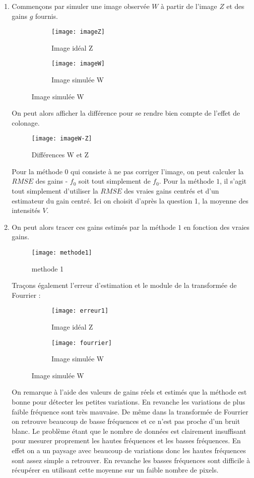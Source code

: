 \documentclass[12pt,a4paper,titlepage]{article}
\begin{document}
\begin{enumerate}
	\item{Commençons par simuler une image observée $W$ à partir de l'image $Z$ et des gains $g$ fournis. 
	\begin{figure}[H]
     		\centering
    		\begin{subfigure}[H]{0.4\textwidth}
         		\centering
         		\texttt{[image: imageZ]}
         		\caption{Image idéal Z}
    		\end{subfigure}
     		\hfill
    	 	\begin{subfigure}[H]{0.4\textwidth}
         		\centering
         		\texttt{[image: imageW]}
         		\caption{Image simulée W}
     		\end{subfigure}
	\end{figure}
	On peut alors afficher la différence pour se rendre bien compte de l'effet de colonage.
	\begin{figure}[H]
    		\texttt{[image: imageW-Z]}
    		\centering
		\caption{Différences W et Z}
	\end{figure}
	Pour la méthode $0$ qui consiste à ne pas corriger l'image, on peut calculer la $RMSE$ des gains - $f_0$ soit tout simplement de $f_0$. Pour la méthode $1$, il s'agit tout simplement d'utiliser la $RMSE$ des vraies gains centrés et d'un estimateur du gain centré. Ici on choisit d'après la question 1, la moyenne des intensités $V$.
	}
	\item{On peut alors tracer ces gains estimés par la méthode $1$ en fonction des vraies gains.
	\begin{figure}[H]
    		\texttt{[image: methode1]}
    		\centering
		\caption{methode 1}
	\end{figure}
	Traçons également l'erreur d'estimation et le module de la transformée de Fourrier :
	\begin{figure}[H]
     		\centering
    		\begin{subfigure}[H]{0.45\textwidth}
         		\centering
         		\texttt{[image: erreur1]}
         		\caption{Image idéal Z}
    		\end{subfigure}
     		\hfill
    	 	\begin{subfigure}[H]{0.45\textwidth}
         		\centering
         		\texttt{[image: fourrier]}
         		\caption{Image simulée W}
     		\end{subfigure}
	\end{figure}
	On remarque à l'aide des valeurs de gains réels et estimés que la méthode est bonne pour détecter les petites variations. En revanche les variations de plus faible fréquence sont très mauvaise. De même dans la transformée de Fourrier on retrouve beaucoup de basse fréquences et ce n'est pas proche d'un bruit blanc. Le problème étant que le nombre de données est clairement insuffisant pour mesurer proprement les hautes fréquences et les basses fréquences. En effet on a un paysage avec beaucoup de variations donc les hautes fréquences sont assez simple a retrouver. En revanche les basses fréquences sont difficile à récupérer en utilisant cette moyenne sur un faible nombre de pixels.
}
\end{enumerate}
\end{document}
